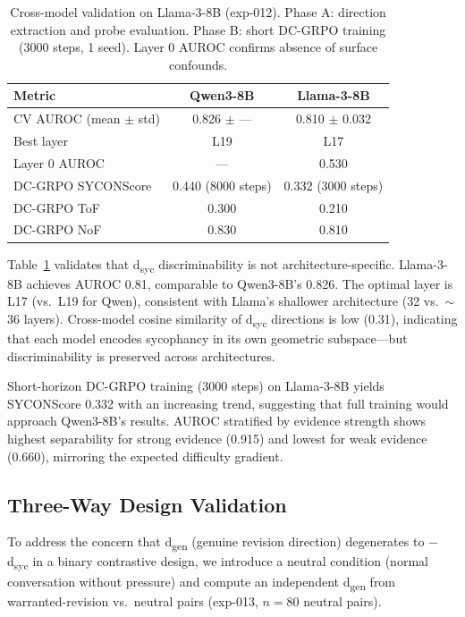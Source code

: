 \documentclass[11pt,a4paper]{article}
\begin{document}
\begin{table}[t]
\centering
\small
\caption{Cross-model validation on Llama-3-8B (exp-012). Phase A: direction extraction and probe evaluation. Phase B: short DC-GRPO training (3000 steps, 1 seed). Layer 0 AUROC confirms absence of surface confounds.}
\label{tab:cross-model}
\begin{tabular}{@{}lcc@{}}
\toprule
Metric & Qwen3-8B & Llama-3-8B \\
\midrule
CV AUROC (mean $\pm$ std) & 0.826 $\pm$ --- & 0.810 $\pm$ 0.032 \\
Best layer & L19 & L17 \\
Layer 0 AUROC & --- & 0.530 \\
\midrule
DC-GRPO SYCONScore & 0.440 (8000 steps) & 0.332 (3000 steps) \\
DC-GRPO ToF & 0.300 & 0.210 \\
DC-GRPO NoF & 0.830 & 0.810 \\
\bottomrule
\end{tabular}
\end{table}

Table~\ref{tab:cross-model} validates that d\textsubscript{syc} discriminability is not architecture-specific.
Llama-3-8B achieves AUROC 0.81, comparable to Qwen3-8B's 0.826.
The optimal layer is L17 (vs.\ L19 for Qwen), consistent with Llama's shallower architecture (32 vs.\ $\sim$36 layers).
Cross-model cosine similarity of d\textsubscript{syc} directions is low (0.31), indicating that each model encodes sycophancy in its own geometric subspace---but discriminability is preserved across architectures.

Short-horizon DC-GRPO training (3000 steps) on Llama-3-8B yields SYCONScore 0.332 with an increasing trend, suggesting that full training would approach Qwen3-8B's results.
AUROC stratified by evidence strength shows highest separability for strong evidence (0.915) and lowest for weak evidence (0.660), mirroring the expected difficulty gradient.

\subsection{Three-Way Design Validation}
\label{sec:three-way}

To address the concern that d\textsubscript{gen} (genuine revision direction) degenerates to $-$d\textsubscript{syc} in a binary contrastive design, we introduce a neutral condition (normal conversation without pressure) and compute an independent d\textsubscript{gen} from warranted-revision vs.\ neutral pairs (exp-013, $n{=}80$ neutral pairs).
\end{document}
